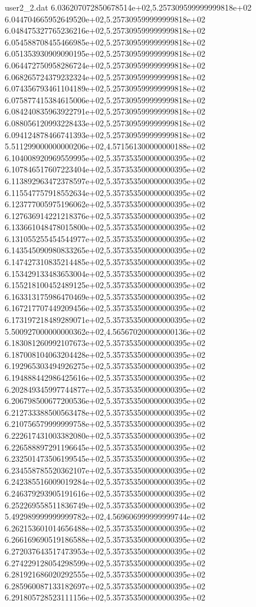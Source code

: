 \begin{filecontents}{user2_2.dat}
6.036207072850678514e+02,5.257309599999999818e+02
6.044704665952649520e+02,5.257309599999999818e+02
6.048475327765236216e+02,5.257309599999999818e+02
6.054588708455466985e+02,5.257309599999999818e+02
6.051353930909090195e+02,5.257309599999999818e+02
6.064472750958286724e+02,5.257309599999999818e+02
6.068265724379232324e+02,5.257309599999999818e+02
6.074356793461104189e+02,5.257309599999999818e+02
6.075877415384615006e+02,5.257309599999999818e+02
6.084240835963922791e+02,5.257309599999999818e+02
6.088056120993228433e+02,5.257309599999999818e+02
6.094124878466741393e+02,5.257309599999999818e+02
5.511299000000000206e+02,4.571561300000000188e+02
6.104008920969559995e+02,5.357353500000000395e+02
6.107846517607223404e+02,5.357353500000000395e+02
6.113892963472378597e+02,5.357353500000000395e+02
6.115547757918552634e+02,5.357353500000000395e+02
6.123777005975196062e+02,5.357353500000000395e+02
6.127636914221218376e+02,5.357353500000000395e+02
6.133661048478015800e+02,5.357353500000000395e+02
6.131055255454544977e+02,5.357353500000000395e+02
6.143545090980833265e+02,5.357353500000000395e+02
6.147427310835214485e+02,5.357353500000000395e+02
6.153429133483653004e+02,5.357353500000000395e+02
6.155218100452489125e+02,5.357353500000000395e+02
6.163313175986470469e+02,5.357353500000000395e+02
6.167217707449209456e+02,5.357353500000000395e+02
6.173197218489289071e+02,5.357353500000000395e+02
5.500927000000000362e+02,4.565670200000000136e+02
6.183081260992107673e+02,5.357353500000000395e+02
6.187008104063204428e+02,5.357353500000000395e+02
6.192965303494926275e+02,5.357353500000000395e+02
6.194888442986425616e+02,5.357353500000000395e+02
6.202849345997744877e+02,5.357353500000000395e+02
6.206798500677200536e+02,5.357353500000000395e+02
6.212733388500563478e+02,5.357353500000000395e+02
6.210756579999999758e+02,5.357353500000000395e+02
6.222617431003382080e+02,5.357353500000000395e+02
6.226588897291196645e+02,5.357353500000000395e+02
6.232501473506199545e+02,5.357353500000000395e+02
6.234558785520362107e+02,5.357353500000000395e+02
6.242385516009019284e+02,5.357353500000000395e+02
6.246379293905191616e+02,5.357353500000000395e+02
6.252269558511836749e+02,5.357353500000000395e+02
5.492989999999999782e+02,4.569606999999999744e+02
6.262153601014656488e+02,5.357353500000000395e+02
6.266169690519186588e+02,5.357353500000000395e+02
6.272037643517473953e+02,5.357353500000000395e+02
6.274229128054298599e+02,5.357353500000000395e+02
6.281921686020292555e+02,5.357353500000000395e+02
6.285960087133182697e+02,5.357353500000000395e+02
6.291805728523111156e+02,5.357353500000000395e+02

\end{filecontents}
